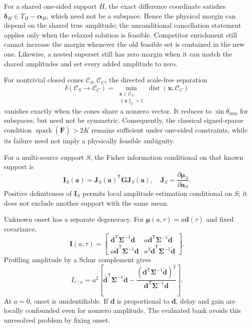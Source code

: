For a shared one-sided support $H$, the exact difference coordinate satisfies
$\bm\delta_H\in T_H-\bm\alpha_H$, which need not be a subspace. Hence the
physical margin can depend on the shared true amplitude; the unconditional
cancellation statement applies only when the relaxed solution is feasible.
Competitor enrichment still cannot increase the margin whenever the old
feasible set is contained in the new one. Likewise, a nested superset still
has zero margin when it can match the shared amplitudes and set every added
amplitude to zero.

For nontrivial closed cones $\mathcal C_S,\mathcal C_C$, the directed
scale-free separation
\begin{equation}
 \delta(\mathcal C_S\!\rightarrow\!\mathcal C_C)
 =\min_{\substack{\bm x\in\mathcal C_S\\\|\bm x\|_2=1}}
 \operatorname{dist}(\bm x,\mathcal C_C)
 \label{eq:supp-directed-cone-separation}
\end{equation}
vanishes exactly when the cones share a nonzero vector. It reduces to
$\sin\theta_{\min}$ for subspaces, but need not be symmetric. Consequently,
the classical signed-sparse condition
$\operatorname{spark}(\overline{\bm F})>2K$ remains sufficient under
one-sided constraints, while its failure need not imply a physically feasible
ambiguity.



For a multi-source support $S$, the Fisher information conditional on that known
support is
\begin{equation}
 \bm I_S(\bm a)=\bm J_S(\bm a)^{\mathsf T}\bm G\bm J_S(\bm a),
 \quad
 \bm J_S=\frac{\partial\bm\mu_S}{\partial\bm a_S}.
 \label{eq:supp-multisource-fisher}
\end{equation}
Positive definiteness of $\bm I_S$ permits local amplitude estimation conditional on $S$; it does not exclude another support with the same mean.

Unknown onset has a separate degeneracy. For $\bm\mu(a,\tau)=a\bm d(\tau)$ and fixed covariance,
\begin{equation}
 \bm I(a,\tau)=
 \begin{bmatrix}
 \bm d^{\mathsf T}\bm\Sigma^{-1}\bm d &
 a\bm d^{\mathsf T}\bm\Sigma^{-1}\dot{\bm d}\\
 a\dot{\bm d}^{\mathsf T}\bm\Sigma^{-1}\bm d &
 a^2\dot{\bm d}^{\mathsf T}\bm\Sigma^{-1}\dot{\bm d}
 \end{bmatrix}.
 \label{eq:supp-onset-fisher-matrix}
\end{equation}
Profiling amplitude by a Schur complement gives
\begin{equation}
 I_{\tau\mid a}=a^2\left[
 \dot{\bm d}^{\mathsf T}\bm\Sigma^{-1}\dot{\bm d}
 -\frac{(\bm d^{\mathsf T}\bm\Sigma^{-1}\dot{\bm d})^2}
 {\bm d^{\mathsf T}\bm\Sigma^{-1}\bm d}
 \right].
 \label{eq:supp-onset-efficient-information}
\end{equation}
At $a=0$, onset is unidentifiable. If $\dot{\bm d}$ is proportional to $\bm d$, delay and gain are locally confounded even for nonzero amplitude. The evaluated bank avoids this unresolved problem by fixing onset.

